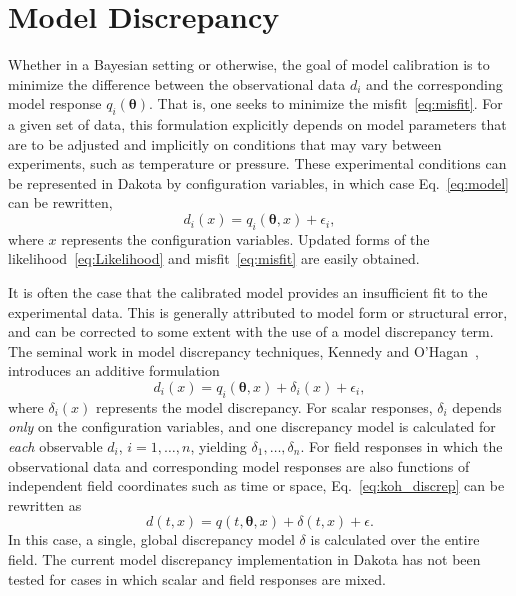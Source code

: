 \section{Model Discrepancy}\label{uq:model_disc}

Whether in a Bayesian setting or otherwise, the goal of model calibration
is to minimize the difference between the observational data $d_i$ and 
the corresponding model response $q_i(\boldsymbol{\theta})$. That is, one seeks
to minimize the misfit~\ref{eq:misfit}. For a given set of data, this 
formulation explicitly depends on model parameters that are to be adjusted and
implicitly on conditions that may vary between experiments, such as temperature
or pressure. These experimental conditions can be represented in Dakota by
configuration variables, in which case Eq.~\ref{eq:model} can be rewritten,
\begin{equation}
d_i(x) = q_i(\boldsymbol{\theta}, x) + \epsilon_i, 
\end{equation} 
where $x$ represents the configuration variables. Updated forms of the 
likelihood~\ref{eq:Likelihood} and misfit~\ref{eq:misfit} are easily obtained.

It is often the case that the calibrated model provides an insufficient fit to
the experimental data. This is generally attributed to model form or 
structural error, and can be corrected to some extent with the use of a model 
discrepancy term. The seminal work in model discrepancy techniques, Kennedy and 
O'Hagan~\cite{Kenn01}, introduces an additive formulation 
\begin{equation}
d_i(x) = q_i\left(\boldsymbol{\theta}, x\right) + \delta_i(x) + \epsilon_i,
\label{eq:koh_discrep}
\end{equation} 
where $\delta_i(x)$ represents the model discrepancy. For scalar responses, 
$\delta_i$ depends \textit{only} on the configuration variables, and one
discrepancy model is calculated for \textit{each} observable $d_i$, $i = 1, 
\ldots, n$, yielding $\delta_1, \ldots, \delta_n$. For field responses in which 
the observational data and corresponding model responses are also functions of 
independent field coordinates such as time or space, Eq.~\ref{eq:koh_discrep} 
can be rewritten as
\begin{equation}
d(t,x) = q(t, \boldsymbol{\theta}, x) + \delta(t,x) + \epsilon.
\end{equation}
In this case, a single, global discrepancy model $\delta$ is calculated over 
the entire field. The current model discrepancy implementation in Dakota has 
not been tested for cases in which scalar and field responses are mixed.

